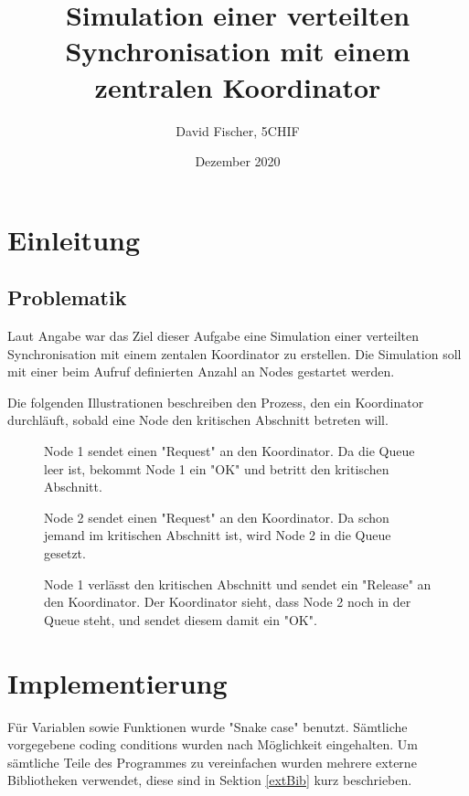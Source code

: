 \documentclass[12pt, letterpaper]{article}
\title{Simulation einer verteilten Synchronisation mit einem zentralen Koordinator}
\author{David Fischer, 5CHIF}
\date{Dezember 2020}
\begin{document}
\begin{titlepage}
\maketitle
\end{titlepage}

\tableofcontents
\newpage

\section{Einleitung}

\subsection{Problematik}
Laut Angabe war das Ziel dieser Aufgabe eine Simulation einer verteilten Synchronisation mit einem zentalen Koordinator zu erstellen. Die Simulation soll mit einer beim Aufruf definierten Anzahl an Nodes gestartet werden.

Die folgenden Illustrationen beschreiben den Prozess, den ein Koordinator durchläuft, sobald eine Node den kritischen Abschnitt betreten will.

\begin{figure}[H]
    \centering
    \resizebox{0.4\textwidth}{!}{}
    \caption{Node 1 sendet einen "Request" an den Koordinator. Da die Queue leer ist, bekommt Node 1 ein "OK" und betritt den kritischen Abschnitt.}
    \label{fig:situation1}
\end{figure}

\begin{figure}[H]
    \centering
    \resizebox{0.4\textwidth}{!}{}
    \caption{Node 2 sendet einen "Request" an den Koordinator. Da schon jemand im kritischen Abschnitt ist, wird Node 2 in die Queue gesetzt.}
    \label{fig:situation2}
\end{figure}


\begin{figure}[H]
    \centering
    \resizebox{0.4\textwidth}{!}{}
    \caption{Node 1 verlässt den kritischen Abschnitt und sendet ein "Release" an den Koordinator. Der Koordinator sieht, dass Node 2 noch in der Queue steht, und sendet diesem damit ein "OK". }
    \label{fig:situation3}
\end{figure}

\section{Implementierung}
Für Variablen sowie Funktionen wurde "Snake case" benutzt. Sämtliche vorgegebene coding conditions wurden nach Möglichkeit eingehalten. Um sämtliche Teile des Programmes zu vereinfachen wurden mehrere externe Bibliotheken verwendet, diese sind in Sektion \ref{extBib} kurz beschrieben. 
\end{document}
